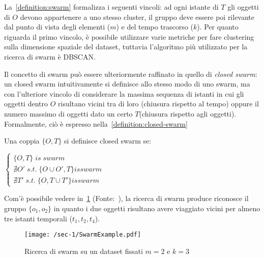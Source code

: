 La~\cref{definition:swarm} formalizza i seguenti vincoli:
ad ogni istante di \(T\) gli oggetti di \(O\) devono appartenere a uno stesso cluster,
il gruppo deve essere poi rilevante dal punto di vista degli elementi (\(m\)) e del tempo trascorso
(\(k\)).
Per quanto riguarda il primo vincolo, è possibile utilizzare varie metriche per fare clustering
sulla dimensione spaziale del dataset, tuttavia l'algoritmo più utilizzato per la ricerca di swarm
è DBSCAN\@.


Il concetto di swarm può essere ulteriormente raffinato in quello di \textit{closed swarm}:
un closed swarm intuitivamente si definisce allo stesso modo di uno swarm, ma con l'ulteriore
vincolo di considerare la massima sequenza di istanti in cui gli oggetti dentro \(O\) risultano vicini
tra di loro (chiusura rispetto al tempo) oppure il numero massimo di oggetti dato un certo \(T\)(chiusura rispetto agli oggetti).
Formalmente, ciò è espresso nella~\cref{definition:closed-swarm}

\begin{definition}\label{definition:closed-swarm}

  Una coppia \( \{ O, T \} \) si definisce closed swarm se:

  \begin{center}

    \(
      \begin{cases}
         \{ O, T \} \; is \; swarm   \\
         \nexists O' \; s.t. \;  \{ O \cup O', T \} is swarm   \\
         \nexists T' \; s.t. \;  \{ O, T \cup T' \} is swarm
      \end{cases}
    \)

  \end{center}

\end{definition}

Com'è possibile vedere in~\cref{fig:chap-1:SwarmExample} (Fonte:~\cite{phan2016all}), la ricerca di swarm produce riconosce
il gruppo \( \{ o_{1}, o_{2}\} \) in quanto i due oggetti risultano avere viaggiato vicini per almeno
tre istanti temporali (\(t_{1}, t_{2}, t_{4}\)).

\begin{figure}
  \centering
  \texttt{[image: /sec-1/SwarmExample.pdf]}
  \caption{Ricerca di swarm su un dataset fissati \(m=2\) e \(k=3\)}%
  \label{fig:chap-1:SwarmExample}
\end{figure}


